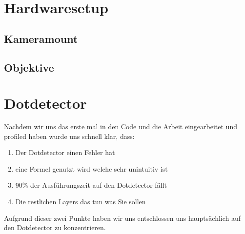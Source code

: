 \documentclass[11pt,a4paper]{article}
\title{\Veranstaltung}
\author{\Autoren}
\date{\today}
\begin{document}
\maketitle


%
%
%
%

\section{Hardwaresetup}%

\subsection{Kameramount}%
\subsection{Objektive}%


\section{Dotdetector}%
Nachdem wir uns das erste mal in den Code und die Arbeit eingearbeitet und profiled haben wurde uns schnell klar, dass:
\begin{enumerate}
\item  Der Dotdetector einen Fehler hat
\item eine Formel genutzt wird welche sehr unintuitiv ist 
\item 90\% der Ausführungszeit auf den Dotdetector fällt
\item Die restlichen Layers das tun was Sie sollen\\
\end{enumerate}
Aufgrund dieser zwei Punkte haben wir uns entschlossen uns hauptsächlich auf den Dotdetector zu konzentrieren.
\end{document}
